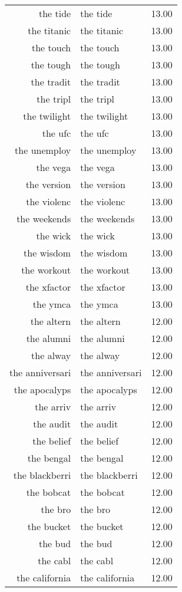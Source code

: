 \begin{table}[ht]
\begin{tabular}{rlr}
  the tide & the tide & 13.00 \\ 
  the titanic & the titanic & 13.00 \\ 
  the touch & the touch & 13.00 \\ 
  the tough & the tough & 13.00 \\ 
  the tradit & the tradit & 13.00 \\ 
  the tripl & the tripl & 13.00 \\ 
  the twilight & the twilight & 13.00 \\ 
  the ufc & the ufc & 13.00 \\ 
  the unemploy & the unemploy & 13.00 \\ 
  the vega & the vega & 13.00 \\ 
  the version & the version & 13.00 \\ 
  the violenc & the violenc & 13.00 \\ 
  the weekends & the weekends & 13.00 \\ 
  the wick & the wick & 13.00 \\ 
  the wisdom & the wisdom & 13.00 \\ 
  the workout & the workout & 13.00 \\ 
  the xfactor & the xfactor & 13.00 \\ 
  the ymca & the ymca & 13.00 \\ 
  the altern & the altern & 12.00 \\ 
  the alumni & the alumni & 12.00 \\ 
  the alway & the alway & 12.00 \\ 
  the anniversari & the anniversari & 12.00 \\ 
  the apocalyps & the apocalyps & 12.00 \\ 
  the arriv & the arriv & 12.00 \\ 
  the audit & the audit & 12.00 \\ 
  the belief & the belief & 12.00 \\ 
  the bengal & the bengal & 12.00 \\ 
  the blackberri & the blackberri & 12.00 \\ 
  the bobcat & the bobcat & 12.00 \\ 
  the bro & the bro & 12.00 \\ 
  the bucket & the bucket & 12.00 \\ 
  the bud & the bud & 12.00 \\ 
  the cabl & the cabl & 12.00 \\ 
  the california & the california & 12.00 \\ 

\end{tabular}
\end{table}
